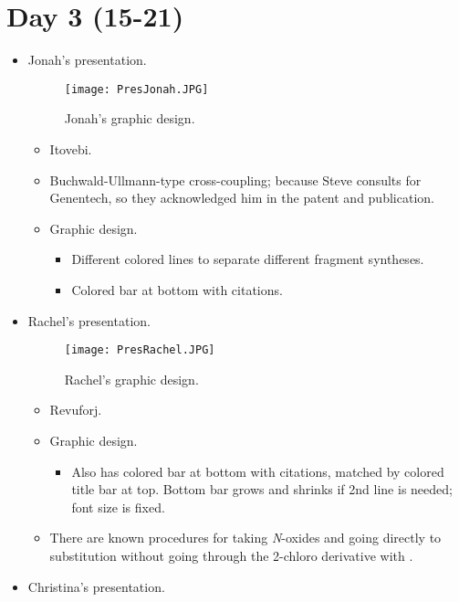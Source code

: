 \documentclass[../notes.tex]{subfiles}
\begin{document}
\section{Day 3 (15-21)}
\begin{itemize}
    \item {}Jonah's presentation.
    \begin{figure}[h!]
        \centering
        \texttt{[image: PresJonah.JPG]}
        \caption{Jonah's graphic design.}
        \label{fig:PresJonah}
    \end{figure}
    \begin{itemize}
        \item Itovebi.
        \item Buchwald-Ullmann-type cross-coupling; because Steve consults for Genentech, so they acknowledged him in the patent and publication.
        \item Graphic design.
        \begin{itemize}
            \item Different colored lines to separate different fragment syntheses.
            \item Colored bar at bottom with citations.
        \end{itemize}
    \end{itemize}
    \item Rachel's presentation.
    \begin{figure}[h!]
        \centering
        \texttt{[image: PresRachel.JPG]}
        \caption{Rachel's graphic design.}
        \label{fig:PresRachel}
    \end{figure}
    \begin{itemize}
        \item Revuforj.
        \item Graphic design.
        \begin{itemize}
            \item Also has colored bar at bottom with citations, matched by colored title bar at top. Bottom bar grows and shrinks if 2nd line is needed; font size is fixed.
        \end{itemize}
        \item There are known procedures for taking \emph{N}-oxides and going directly to substitution without going through the 2-chloro derivative with .
    \end{itemize}
    \item Christina's presentation.

\end{itemize}
\end{document}
